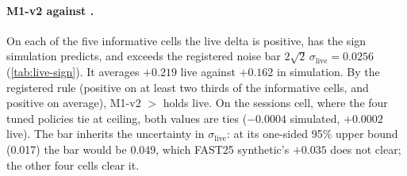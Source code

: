 \paragraph{M1-v2 against .}
On each of the five informative cells the live delta is positive, has the sign simulation predicts,
and exceeds the registered noise bar $2\sqrt{2}\,\sigma_{\mathrm{live}} = 0.0256$
(\cref{tab:live-sign}). It averages $+0.219$ live against $+0.162$ in simulation. By the registered
rule (positive on at least two thirds of the informative cells, and positive on average), M1-v2 $>$
 holds live. On the sessions cell, where the four tuned policies tie at ceiling, both
values are ties ($-0.0004$ simulated, $+0.0002$ live). The bar inherits the uncertainty in
$\sigma_{\mathrm{live}}$: at its one-sided 95\% upper bound (0.017) the bar would be 0.049, which
FAST25 synthetic's $+0.035$ does not clear; the other four cells clear it.

\begin{table}[tbp]
  \centering
  \caption{M1-v2 minus tuned  per live cell: simulated at $\krep = 0$ and live. The
    registered sign test counts the five informative cells.}
  \label{tab:live-sign}
  
\end{table}

